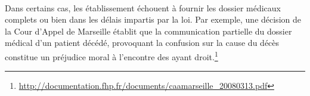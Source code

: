 \paragraph{}
Dans certains cas, les établissement échouent à fournir les dossier médicaux
complets ou bien dans les délais impartis par la loi. Par exemple, une décision
de la Cour d'Appel de Marseille établit que la communication partielle du
dossier médical d'un patient décédé, provoquant la confusion sur la cause du
décès constitue un préjudice moral à l'encontre des ayant droit.\footnote{\url{http://documentation.fhp.fr/documents/caamarseille_20080313.pdf}}
